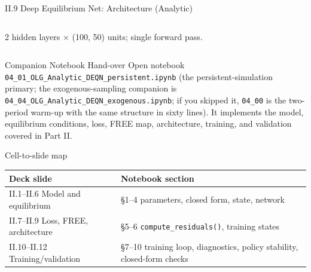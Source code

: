 \documentclass[aspectratio=169,11pt]{beamer}
\newcommand{\emphc}[1]{\textcolor{harvardcrimson}{#1}}
\begin{document}
\begin{frame}{II.9 Deep Equilibrium Net: Architecture (Analytic)}
\begin{columns}[T,totalwidth=0.96\textwidth]

{\footnotesize 2 hidden layers $\times$ (100, 50) units; single forward pass.}
\end{columns}
\end{frame}


\begin{frame}{Companion Notebook Hand-over}
\scriptsize
\emphc{Open notebook \texttt{04\_01\_OLG\_Analytic\_DEQN\_persistent.ipynb}} (the persistent-simulation primary; the exogenous-sampling companion is \texttt{04\_04\_OLG\_Analytic\_DEQN\_exogenous.ipynb}; if you skipped it, \texttt{04\_00} is the two-period warm-up with the same structure in sixty lines).  It implements the model, equilibrium conditions, loss, FREE map, architecture, training, and validation covered in Part II.
\vspace{-2pt}
\begin{block}{Cell-to-slide map}
\vspace{-4pt}
\begin{center}\renewcommand{\arraystretch}{0.85}
{\scriptsize
\begin{tabular}{ll}
\toprule
\textbf{Deck slide} & \textbf{Notebook section} \\
\midrule
II.1--II.6 Model and equilibrium        & \S 1--4 \;parameters, closed form, state, network \\
II.7--II.9 Loss, FREE, architecture     & \S 5--6 \;\texttt{compute\_residuals()}, training states \\
II.10--II.12 Training/validation        & \S 7--10 \;training loop, diagnostics, policy stability, closed-form checks \\
\bottomrule
\end{tabular}}
\end{center}
\vspace{-4pt}
\end{block}
\end{frame}
\end{document}
